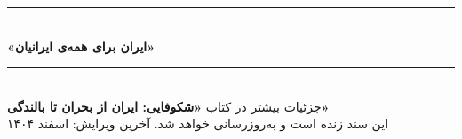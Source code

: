 \documentclass[a4paper,11pt]{article}
\begin{document}
\vspace{0.5cm}

\begin{center}
    \textcolor{mahestan-purple}{\rule{6cm}{1.5pt}}\\[0.4cm]
    {\Large\bfseries\textcolor{mahestan-blue}{«ایران برای همه‌ی ایرانیان»}}\\[0.4cm]
    \textcolor{mahestan-purple}{\rule{6cm}{1.5pt}}\\[0.4cm]
    {\small جزئیات بیشتر در کتاب \textbf{«شکوفایی: ایران از بحران تا بالندگی»}}\\[0.2cm]
    {\footnotesize\textcolor{text-medium}{این سند زنده است و به‌روزرسانی خواهد شد. آخرین ویرایش: اسفند ۱۴۰۴}}
\end{center}
\end{document}
